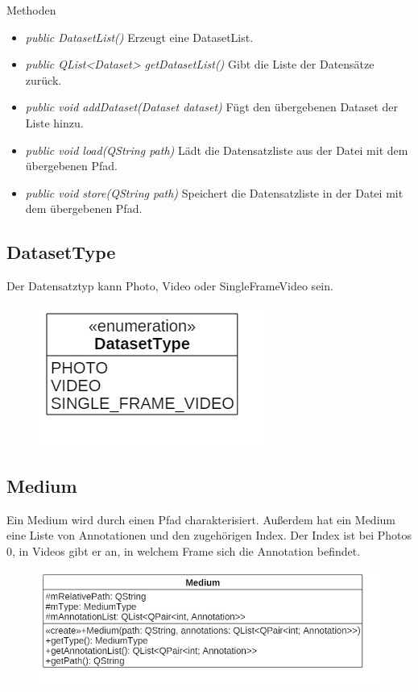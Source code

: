 Methoden
\begin{itemize}
\item \textit{public DatasetList()} Erzeugt eine DatasetList.
\item \textit{public QList<Dataset> getDatasetList()} Gibt die Liste der Datensätze zurück.
\item \textit{public void addDataset(Dataset dataset)} Fügt den übergebenen Dataset der Liste hinzu.
\item \textit{public void load(QString path)} Lädt die Datensatzliste aus der Datei mit dem übergebenen Pfad.
\item \textit{public void store(QString path)} Speichert die Datensatzliste in der Datei mit dem übergebenen Pfad.
\end{itemize}

\subsection*{DatasetType}
Der Datensatztyp kann Photo, Video oder SingleFrameVideo sein.

\begin{figure}[H]
\centering
\includegraphics[scale=0.5]{img/Klassendiagramm/Klassen/Model/DatasetType}
\label{fig:datasetType}
\end{figure}

\subsection*{Medium}
Ein Medium wird durch einen Pfad charakterisiert. Außerdem hat ein Medium eine Liste von Annotationen und den zugehörigen Index. Der Index ist bei Photos 0, in Videos gibt er an, in welchem Frame sich die Annotation befindet.

\begin{figure}[H]
\centering
\includegraphics[scale=0.5]{img/Klassendiagramm/Klassen/Model/Medium}
\label{fig:medium}
\end{figure}

